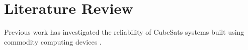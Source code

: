 \section{Literature Review}
Previous work has investigated the reliability of CubeSats systems built using
commodity computing devices \cite{odegaard2013error}.
